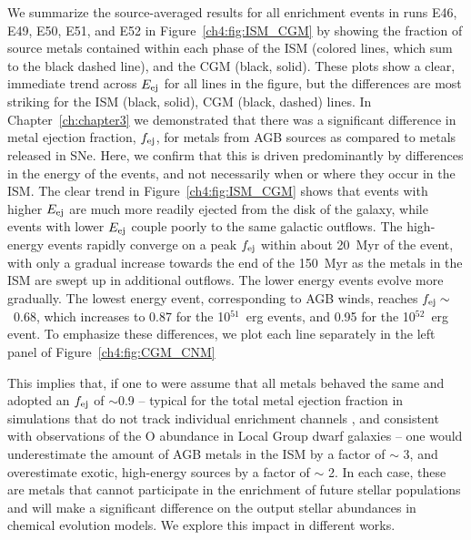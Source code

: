 We summarize the source-averaged results for all enrichment events in runs \runone E46, \runone E49, \runone E50, \runone E51, and \runone E52 in Figure~\ref{ch4:fig:ISM_CGM} by showing the fraction of source metals contained within each phase of the ISM (colored lines, which sum to the black dashed line), and the CGM (black, solid). These plots show a clear, immediate trend across $E_{\rm ej}$ for all lines in the figure, but the differences are most striking for the ISM (black, solid), CGM (black, dashed) lines. In Chapter~\ref{ch:chapter3}
we demonstrated that there was a significant difference in metal ejection fraction, $f_{\rm ej}$, for metals from AGB sources as compared to metals released in SNe. Here, we confirm that this is driven predominantly by differences in the energy of the events, and not necessarily when or where they occur in the ISM. The clear trend in Figure~\ref{ch4:fig:ISM_CGM} shows that events with higher $E_{\rm ej}$ are much more readily ejected from the disk of the galaxy, while events with lower $E_{\rm ej}$ couple poorly to the same galactic outflows.
The high-energy events rapidly converge on a peak $f_{\rm ej}$ within about 20~Myr of the event, with only a gradual increase towards the end of the 150~Myr as the metals in the ISM are swept up in additional outflows. The lower energy events evolve more gradually. The lowest energy event, corresponding to AGB winds, reaches $f_{\rm ej} \sim$~0.68, which increases to 0.87 for the 10$^{51}$~erg events, and 0.95 for the 10$^{52}$~erg event. To emphasize these differences, we plot each line separately in the left panel of Figure~\ref{ch4:fig:CGM_CNM}

This implies that, if one to were assume that all metals behaved the same and adopted an $f_{\rm ej}$ of $\sim$0.9 -- typical for the total metal ejection fraction in simulations that do not track individual enrichment channels \citep[e.g.][]{Muratov2017,Christensen2018}, and consistent with observations of the O abundance in Local Group dwarf galaxies \citep[e.g.][]{Kirby2011,McQuinn2015} -- one would underestimate the amount of AGB metals in the ISM by a factor of $\sim$ 3, and overestimate exotic, high-energy sources by a factor of $\sim$ 2. In each case, these are metals that cannot participate in the enrichment of future stellar populations and will make a significant difference on the output stellar abundances in chemical evolution models. We explore this impact in different works.

